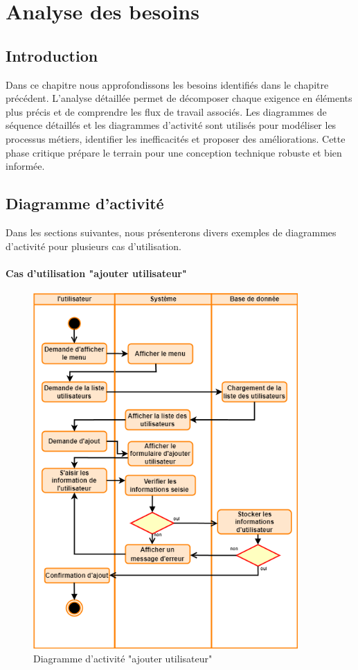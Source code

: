 \documentclass[edit,12pt,a4paper,ChapStyle,oneside,doubleinterligne]{report}
\begin{document}
\chapter{Analyse des besoins}
\section{Introduction}
Dans ce chapitre nous approfondissons les besoins identifiés dans le chapitre précédent. L'analyse détaillée permet de décomposer chaque exigence en éléments plus précis et de comprendre les flux de travail associés. Les diagrammes de séquence détaillés et les diagrammes d'activité sont utilisés pour modéliser les processus métiers, identifier les inefficacités et proposer des améliorations. Cette phase critique prépare le terrain pour une conception technique robuste et bien informée.
\section{Diagramme d'activité}
Dans les sections suivantes, nous présenterons divers exemples de diagrammes d'activité pour plusieurs cas d'utilisation.
\subsubsection{Cas d'utilisation "ajouter utilisateur"}
\begin{figure}[h!]\label{fig:activite utilisateur}
    \centering
    \includegraphics[width=0.9\textwidth]{images/act ajouter utilisateur.png}
    \caption{Diagramme d'activité "ajouter utilisateur"}
\end{figure}
\end{document}
